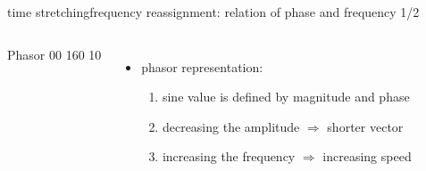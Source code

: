         \begin{frame}{time stretching}{frequency reassignment: relation of phase and frequency 1/2}
            \begin{columns}
            \vspace{-10mm}
                {Phasor}
                {00}
                {160}
                {10}
           \begin{itemize}
                \item   phasor representation:
                    \begin{enumerate}
                        \item   sine value is defined by magnitude and phase
                        \item   decreasing the amplitude $\Rightarrow$ shorter vector
                        \item   increasing the frequency $\Rightarrow$ increasing speed
                    \end{enumerate}
            \end{itemize}
            \end{columns}
        \end{frame}
